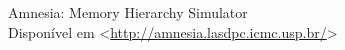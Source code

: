 \begin{thebibliography}{9}

	Amnesia: Memory Hierarchy Simulator\\
	Disponível em \textless\url{http://amnesia.lasdpc.icmc.usp.br/}\textgreater\


\end{thebibliography}

